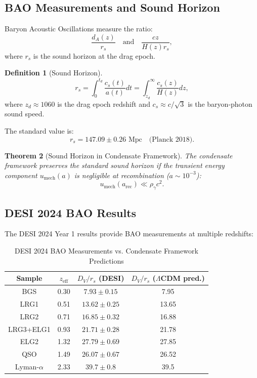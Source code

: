 \documentclass[11pt,a4paper]{article}
\newtheorem{theorem}{Theorem}[section]
\theoremstyle{definition}
\newtheorem{definition}[theorem]{Definition}
\theoremstyle{remark}
\begin{document}
\subsection{BAO Measurements and Sound Horizon}
\label{sec:BAO}

Baryon Acoustic Oscillations measure the ratio:
\begin{equation}
\frac{d_A(z)}{r_s} \quad \text{and} \quad \frac{cz}{H(z)r_s},
\end{equation}
where $r_s$ is the sound horizon at the drag epoch.

\begin{definition}[Sound Horizon]
\begin{equation}
r_s = \int_0^{t_d} \frac{c_s(t)}{a(t)} dt = \int_{z_d}^\infty \frac{c_s(z)}{H(z)} dz,
\end{equation}
where $z_d \approx 1060$ is the drag epoch redshift and $c_s \approx c/\sqrt{3}$ is the baryon-photon sound speed.
\end{definition}

The standard value is:
\begin{equation}
r_s = 147.09 \pm 0.26 \text{ Mpc} \quad \text{(Planck 2018)}.
\end{equation}

\begin{theorem}[Sound Horizon in Condensate Framework]
\label{thm:r_s_condensate}
The condensate framework preserves the standard sound horizon if the transient energy component $u_{\mathrm{mech}}(a)$ is negligible at recombination ($a \sim 10^{-3}$):
\begin{equation}
u_{\mathrm{mech}}(a_{\mathrm{rec}}) \ll \rho_\gamma c^2.
\end{equation}
\end{theorem}

\subsection{DESI 2024 BAO Results}
\label{sec:DESI}

The DESI 2024 Year 1 results \cite{DESI2024} provide BAO measurements at multiple redshifts:

\begin{table}[H]
\centering
\caption{DESI 2024 BAO Measurements vs. Condensate Framework Predictions}
\label{tab:DESI}
\begin{tabular}{@{}cccc@{}}
\toprule
Sample & $z_{\mathrm{eff}}$ & $D_V/r_s$ (DESI) & $D_V/r_s$ ($\Lambda$CDM pred.) \\
\midrule
BGS & 0.30 & $7.93 \pm 0.15$ & 7.95 \\
LRG1 & 0.51 & $13.62 \pm 0.25$ & 13.65 \\
LRG2 & 0.71 & $16.85 \pm 0.32$ & 16.88 \\
LRG3+ELG1 & 0.93 & $21.71 \pm 0.28$ & 21.78 \\
ELG2 & 1.32 & $27.79 \pm 0.69$ & 27.85 \\
QSO & 1.49 & $26.07 \pm 0.67$ & 26.52 \\
Lyman-$\alpha$ & 2.33 & $39.7 \pm 0.8$ & 39.5 \\
\bottomrule
\end{tabular}
\end{table}
\end{document}

